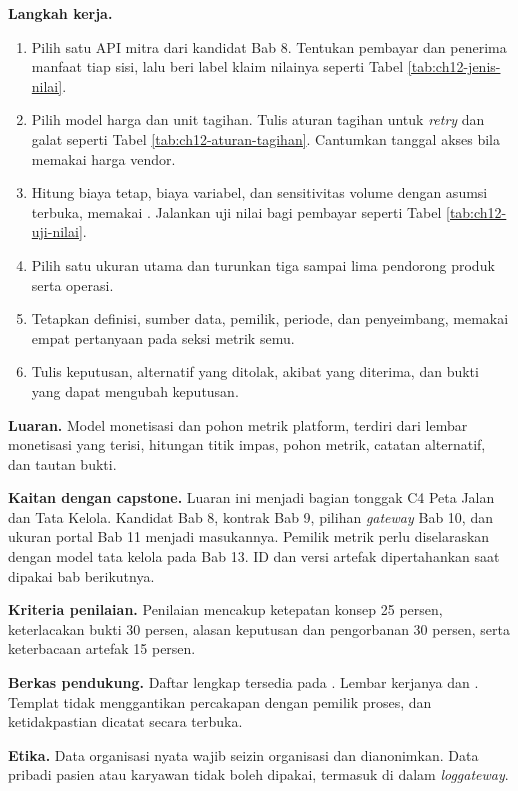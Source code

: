 \textbf{Langkah kerja.}
\begin{enumerate}
  \item Pilih satu API mitra dari kandidat Bab 8. Tentukan pembayar dan penerima manfaat tiap sisi, lalu beri label klaim nilainya seperti Tabel \ref{tab:ch12-jenis-nilai}.
  \item Pilih model harga dan unit tagihan. Tulis aturan tagihan untuk \textit{retry} dan galat seperti Tabel \ref{tab:ch12-aturan-tagihan}. Cantumkan tanggal akses bila memakai harga vendor.
  \item Hitung biaya tetap, biaya variabel, dan sensitivitas volume dengan asumsi terbuka, memakai . Jalankan uji nilai bagi pembayar seperti Tabel \ref{tab:ch12-uji-nilai}.
  \item Pilih satu ukuran utama dan turunkan tiga sampai lima pendorong produk serta operasi.
  \item Tetapkan definisi, sumber data, pemilik, periode, dan penyeimbang, memakai empat pertanyaan pada seksi metrik semu.
  \item Tulis keputusan, alternatif yang ditolak, akibat yang diterima, dan bukti yang dapat mengubah keputusan.
\end{enumerate}

\textbf{Luaran.} Model monetisasi dan pohon metrik platform, terdiri dari lembar monetisasi yang terisi, hitungan titik impas, pohon metrik, catatan alternatif, dan tautan bukti.

\textbf{Kaitan dengan capstone.} Luaran ini menjadi bagian tonggak C4 Peta Jalan dan Tata Kelola. Kandidat Bab 8, kontrak Bab 9, pilihan \textit{gateway} Bab 10, dan ukuran portal Bab 11 menjadi
masukannya. Pemilik metrik perlu diselaraskan dengan model tata kelola pada Bab 13. ID dan versi artefak dipertahankan saat dipakai bab berikutnya.

\textbf{Kriteria penilaian.} Penilaian mencakup ketepatan konsep 25 persen, keterlacakan bukti 30 persen, alasan keputusan dan pengorbanan 30 persen, serta keterbacaan artefak 15 persen.

\textbf{Berkas pendukung.} Daftar lengkap tersedia pada . Lembar kerjanya  dan
. Templat tidak menggantikan percakapan dengan pemilik proses, dan ketidakpastian dicatat secara terbuka.

\textbf{Etika.} Data organisasi nyata wajib seizin organisasi dan dianonimkan. Data pribadi pasien atau karyawan tidak boleh dipakai, termasuk di dalam \textit{log}\textit{gateway}.

